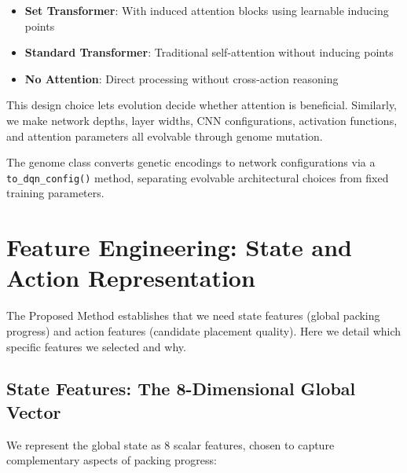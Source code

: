 \begin{itemize}
    \item \textbf{Set Transformer}: With induced attention blocks using learnable inducing points
    \item \textbf{Standard Transformer}: Traditional self-attention without inducing points
    \item \textbf{No Attention}: Direct processing without cross-action reasoning
\end{itemize}

This design choice lets evolution decide whether attention is beneficial. Similarly, we make network depths, layer widths, CNN configurations, activation functions, and attention parameters all evolvable through genome mutation.

The genome class converts genetic encodings to network configurations via a \texttt{to\_dqn\_config()} method, separating evolvable architectural choices from fixed training parameters.

\section{Feature Engineering: State and Action Representation}

The Proposed Method establishes that we need state features (global packing progress) and action features (candidate placement quality). Here we detail which specific features we selected and why.

\subsection{State Features: The 8-Dimensional Global Vector}

We represent the global state as 8 scalar features, chosen to capture complementary aspects of packing progress:


